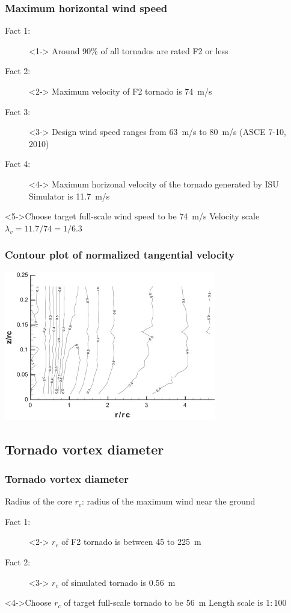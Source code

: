 \documentclass{beamer}
\begin{document}
\begin{frame}
	\frametitle{Maximum horizontal wind speed}
	\begin{description}
		\item[Fact 1:  ]<1-> Around 90\% of all tornados are rated F2 or less
		\item[Fact 2: ]<2-> Maximum velocity of F2 tornado is \alert{\SI{74}{m/s}}
		\item[Fact 3: ]<3-> Design wind speed ranges from \alert{\SI{63}{m/s}} to \alert{\SI{80}{m/s}} (ASCE 7-10, 2010)
		\item[Fact 4: ]<4-> Maximum horizonal velocity of the tornado generated by ISU Simulator is \alert{\SI{11.7}{m/s}}
	\end{description}
	\begin{block}<5->{Choose target full-scale wind speed to be \alert{\SI{74}{m/s}}}
			 Velocity scale $\lambda_v=11.7/74=1/6.3$
	\end{block} 
\end{frame}

\begin{frame}
	\frametitle{Contour plot of normalized tangential velocity}
	\includegraphics{./fig/1.jpg}
\end{frame}

\subsection{Tornado vortex diameter}

\begin{frame}
	\frametitle{Tornado vortex diameter}
	\begin{definition}
	 	\alert{Radius of the core $r_c$}: radius of the maximum wind near the ground
	\end{definition}
	\begin{description}
		\item[Fact 1: ]<2-> $r_c$ of F2 tornado is between \alert{\SI{45}{} to \SI{225}{m}}
		\item[Fact 2: ]<3-> $r_c$ of simulated tornado is \alert{\SI{0.56}{m}}
	\end{description}
	\begin{block}<4->{Choose $r_c$ of target full-scale tornado to be \alert{\SI{56}{m}}}
		   Length scale is $1:100$ 
	\end{block} 

\end{frame}
\end{document}
